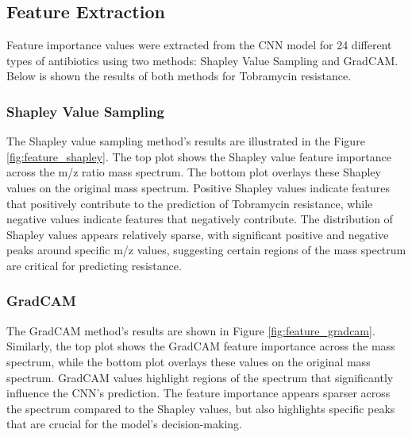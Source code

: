 \documentclass[english,11pt,a4paper,titlepage]{article}
\begin{document}
\subsection*{Feature Extraction}
Feature importance values were extracted from the CNN model for 24 different types of antibiotics using two methods: Shapley Value Sampling and GradCAM. Below is shown the results of both methods for Tobramycin resistance.

\subsubsection*{Shapley Value Sampling}
The Shapley value sampling method's results are illustrated in the Figure \ref{fig:feature_shapley}. The top plot shows the Shapley value feature importance across the m/z ratio mass spectrum. The bottom plot overlays these Shapley values on the original mass spectrum. Positive Shapley values indicate features that positively contribute to the prediction of Tobramycin resistance, while negative values indicate features that negatively contribute. The distribution of Shapley values appears relatively sparse, with significant positive and negative peaks around specific m/z values, suggesting certain regions of the mass spectrum are critical for predicting resistance.

\subsubsection*{GradCAM}
The GradCAM method's results are shown in Figure \ref{fig:feature_gradcam}. Similarly, the top plot shows the GradCAM feature importance across the mass spectrum, while the bottom plot overlays these values on the original mass spectrum. GradCAM values highlight regions of the spectrum that significantly influence the CNN's prediction. The feature importance appears sparser across the spectrum compared to the Shapley values, but also highlights specific peaks that are crucial for the model's decision-making.
\end{document}
